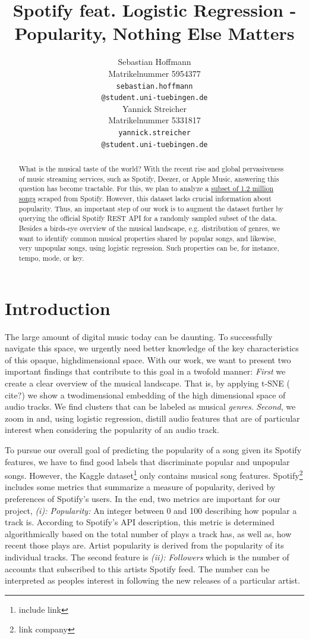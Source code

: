 \documentclass{article}
\title{Spotify feat. Logistic Regression - \\ Popularity, Nothing Else Matters}
\author{%
  Sebastian Hoffmann\\
  Matrikelnummer 5954377\\
  \texttt{sebastian.hoffmann} \\ 
  \small \texttt{@student.uni-tuebingen.de} \\ %
  \And
  Yannick Streicher\\
  Matrikelnummer 5331817\\
  \texttt{yannick.streicher} \\ 
  \small \texttt{@student.uni-tuebingen.de} \\ %
}
\newcommand{\todo}[1]{{\color{red} #1}}
\begin{document}
\maketitle

\begin{abstract}
  What is the musical taste of the world? With the recent rise and global pervasiveness of music streaming services, such as Spotify, Deezer, or Apple Music, answering this question has become tractable. For this, we plan to analyze a \href{https://www.kaggle.com/rodolfofigueroa/spotify-12m-songs}{subset of 1.2 million songs} scraped from Spotify. However, this dataset lacks crucial information about popularity. Thus, an important step of our work is to augment the dataset further by querying the official Spotify REST API for a randomly sampled subset of the data. Besides a birds-eye overview of the musical landscape, e.g. distribution of genres, we want to identify common musical properties shared by popular songs, and likewise, very unpopular songs, using logistic regression. Such properties can be, for instance, tempo, mode, or key.
\end{abstract}

\section{Introduction}
The large amount of digital music today can be daunting. To successfully navigate this space, we urgently need better knowledge of the key characteristics of this opaque, highdimensional space. With our work, we want to present two important findings that contribute to this goal in a twofold manner: \textit{First} we create a clear overview of the musical landscape. That is, by applying t-SNE (\todo{cite?}) we show a twodimensional embedding of the high dimensional space of audio tracks. We find clusters that can be labeled as musical \textit{genres}. \textit{Second}, we zoom in and, using logistic regression, distill audio features that are of particular interest when considering the popularity of an audio track.

To pursue our overall goal of predicting the popularity of a song given its Spotify features, we have to find good labels that discriminate popular and unpopular songs. However, the Kaggle dataset\footnote{include link} only contains musical song features. Spotify\footnote{link company} includes some metrics that summarize a measure of popularity, derived by preferences of Spotify's users. In the end, two metrics are important for our project, \textit{(i): Popularity:} An integer between 0 and 100 describing how popular a track is. According to Spotify's API description, this metric is determined algorithmically based on the total number of plays a track has, as well as, how recent those plays are. Artist popularity is derived from the popularity of its individual tracks. The second feature is \textit{(ii): Followers} which is the number of accounts that subscribed to this artists Spotify feed. The number can be interpreted as peoples interest in following the new releases of a particular artist.
\end{document}
